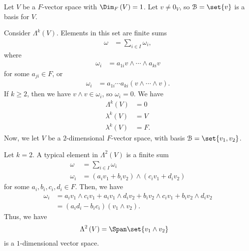 \documentclass[10pt]{mypackage}
\begin{document}
  \begin{example}
    Let $V$ be a $F$-vector space with $\Dim_{F}\left(V\right) = 1$. Let $v\neq 0_V$, so $\mathcal{B} = \set{v}$ is a basis for $V$.\newline

    Consider $\Lambda^{k}\left(V\right)$. Elements in this set are finite sums
    \begin{align*}
      \omega &= \sum_{i\in I}\omega_i,
    \end{align*}
    where
    \begin{align*}
      \omega_i &= a_{1i}v\wedge\cdots\wedge a_{ki} v
    \end{align*}
    for some $a_{ji}\in F$, or
    \begin{align*}
      \omega_i &= a_{1i}\cdots a_{ki}\left(v\wedge\cdots\wedge v\right).
    \end{align*}
    If $k\geq 2$, then we have $v\wedge v\in \omega_i$, so $\omega_i = 0$. We have
    \begin{align*}
      \Lambda^{k}\left(V\right)&= 0 \tag*{$k\geq 2$}\\
      \lambda^{k}\left(V\right) &= V \tag*{$k=1$}\\
      \lambda^{k}\left(V\right) &= F. \tag*{$k=0$}
    \end{align*}
    Now, we let $V$ be a $2$-dimensional $F$-vector space, with basis $\mathcal{B} = \set{v_1,v_2}$.\newline

    Let $k = 2$. A typical element in $\Lambda^{2}\left(V\right)$ is a finite sum
    \begin{align*}
      \omega &= \sum_{i\in I}\omega_i\\
             \omega_i &= \left(a_iv_1 + b_iv_2\right)\wedge \left(c_iv_1 + d_iv_2\right)
    \end{align*}
    for some $a_i,b_i,c_i,d_i\in F$. Then, we have
    \begin{align*}
      \omega_i &= a_iv_1\wedge c_iv_1 + a_iv_1 \wedge d_iv_2 + b_iv_2\wedge c_iv_1 + b_iv_2 \wedge d_iv_2\\
               &= \left(a_id_i - b_ic_i\right)\left(v_1\wedge v_2\right).
    \end{align*}
    Thus, we have
    \begin{align*}
      \Lambda^{2}\left(V\right) &= \Span\set{v_1\wedge v_2}
    \end{align*}
    is a $1$-dimensional vector space.\newline


\end{example}
\end{document}
